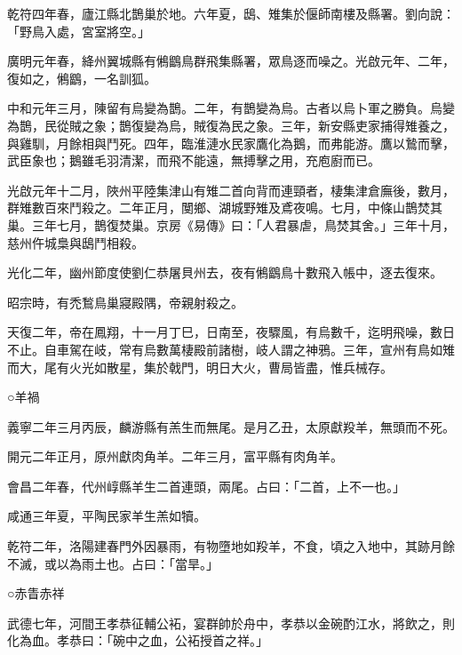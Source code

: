 \begin{pinyinscope}
 乾符四年春，廬江縣北鵲巢於地。六年夏，鴟、雉集於偃師南樓及縣署。劉向說：「野鳥入處，宮室將空。」



 廣明元年春，絳州翼城縣有鵂鶹鳥群飛集縣署，眾鳥逐而噪之。光啟元年、二年，復如之，鵂鶹，一名訓狐。



 中和元年三月，陳留有烏變為鵲。二年，有鵲變為烏。古者以烏卜軍之勝負。烏變為鵲，民從賊之象；鵲復變為烏，賊復為民之象。三年，新安縣吏家捕得雉養之，與雞馴，月餘相與鬥死。四年，臨淮漣水民家鷹化為鵝，而弗能游。鷹以鷙而擊，武臣象也；鵝雖毛羽清潔，而飛不能遠，無搏擊之用，充庖廚而已。



 光啟元年十二月，陜州平陸集津山有雉二首向背而連頸者，棲集津倉廡後，數月，群雉數百來鬥殺之。二年正月，閺鄉、湖城野雉及鳶夜鳴。七月，中條山鵲焚其巢。三年七月，鵲復焚巢。京房《易傳》曰：「人君暴虐，鳥焚其舍。」三年十月，慈州仵城梟與鴟鬥相殺。



 光化二年，幽州節度使劉仁恭屠貝州去，夜有鵂鶹鳥十數飛入帳中，逐去復來。



 昭宗時，有禿鶖鳥巢寢殿隅，帝親射殺之。



 天復二年，帝在鳳翔，十一月丁巳，日南至，夜驟風，有烏數千，迄明飛噪，數日不止。自車駕在岐，常有烏數萬棲殿前諸樹，岐人謂之神鴉。三年，宣州有鳥如雉而大，尾有火光如散星，集於戟門，明日大火，曹局皆盡，惟兵械存。



 ○羊禍



 義寧二年三月丙辰，麟游縣有羔生而無尾。是月乙丑，太原獻羖羊，無頭而不死。



 開元二年正月，原州獻肉角羊。二年三月，富平縣有肉角羊。



 會昌二年春，代州崞縣羊生二首連頭，兩尾。占曰：「二首，上不一也。」



 咸通三年夏，平陶民家羊生羔如犢。



 乾符二年，洛陽建春門外因暴雨，有物墮地如羖羊，不食，頃之入地中，其跡月餘不滅，或以為雨土也。占曰：「當旱。」



 ○赤眚赤祥



 武德七年，河間王孝恭征輔公袥，宴群帥於舟中，孝恭以金碗酌江水，將飲之，則化為血。孝恭曰：「碗中之血，公袥授首之祥。」




\end{pinyinscope}
